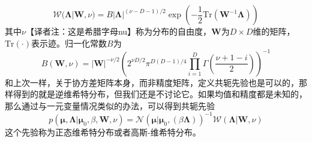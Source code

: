 \documentclass[b5paper]{book}
\numberwithin{equation}{chapter}
\newcommand {\bfMu} {\boldsymbol{\mu}}
\newcommand {\bfLambda} {\boldsymbol{\Lambda}}
\begin{document}
{	\begin{equation}
		\mathcal{W}(\bfLambda|\mathbf{W},\nu)=B|\bfLambda|^{(\nu-D-1)/2}\exp\left(-\frac{1}{2}\mathrm{Tr}(\mathbf{W}^{-1}\bfLambda)\right)
	\end{equation}
	其中$\nu$【译者注：这是希腊字母nu】称为分布的自由度，$\mathbf{W}$为$D\times D$维的矩阵，$\mathrm{Tr(\cdot)}$表示迹。归一化常数$B$为
	\begin{equation}
		B(\mathbf{W},\nu)=|\mathbf{W}|^{-\nu/2}\left(2^{\nu D/2}\pi^{D(D-1)/4}\prod_{i=1}^D\Gamma\left(\frac{\nu+1-i}{2}\right)\right)^{-1}
	\end{equation}
	和上次一样，关于协方差矩阵本身，而非精度矩阵，定义共轭先验也是可以的，那样得到的就是逆维希特分布，但我们还是不讨论它。如果均值和精度都是未知的，那么通过与一元变量情况类似的办法，可以得到共轭先验
	\begin{equation}
		p(\bfMu,\bfLambda|\bfMu_0,\beta,\mathbf{W},\nu)=\mathcal{N}(\bfMu|\bfMu_0,(\beta\bfLambda))^{-1}\mathcal{W}(\bfLambda|\mathbf{W},\nu)
	\end{equation}
	这个先验称为正态维希特分布或者高斯-维希特分布。
	}
\end{document}
